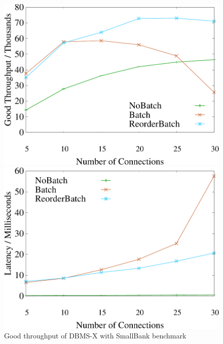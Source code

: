 \begin{figure}[t]
	\centering
	\begin{minipage}[b]{0.32\linewidth}
		\centering
		\includegraphics[width=\textwidth]{./exp_fig/hekaton/hekaton_tps}
		\vspace{-2em}
		\caption{Good throughput of DBMS-X with SmallBank benchmark}
		\label{fig:hekaton:tps}
	\end{minipage}
	\begin{minipage}[b]{0.32\linewidth}
	\centering
	\includegraphics[width=\textwidth]{./exp_fig/hekaton/hekaton_latency}

\end{minipage}
\end{figure}
